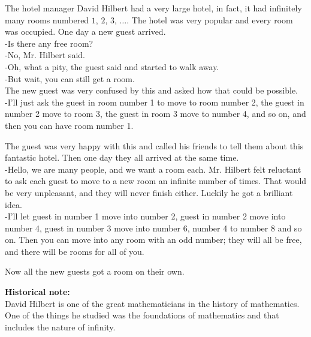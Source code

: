\documentclass[12pt]{article}
\begin{document}

The hotel manager David Hilbert had a very large hotel, in fact, it had infinitely many rooms numbered $1$, $2$, $3$, $\ldots$.  The hotel was very popular and every room was occupied. One day a new guest arrived.\\
-Is there any free room?\\
-No, Mr. Hilbert said.\\
-Oh, what a pity, the guest said and started to walk away.\\
-But wait, you can still get a room.\\

The new guest was very confused by this and asked how that could be possible.\\
-I'll just ask the guest in room number 1 to move to room number 2, the guest in number 2 move to room 3, the guest in room 3 move to number 4, and so on, and then you can have room number 1.

The guest was very happy with this and called his friends to tell them about this fantastic hotel. Then one day they all arrived at the same time.\\
-Hello, we are  many people, and we want a room each.
Mr. Hilbert felt reluctant to ask each guest to move to a new room an infinite number of times. That would be very unpleasant, and they will never finish either. Luckily he got a brilliant idea.\\
-I'll let guest in number 1 move into number 2, guest in number 2 move into number 4, guest in number 3 move into number 6, number 4 to number 8 and so on.
Then you can move into any room with an odd number; they will all be free, and there will be rooms for all of you.

Now all the new guests got a room on their own.

\textbf{Historical note:}\\
David Hilbert is one of the great mathematicians in the history of mathematics. One of the things he studied was the foundations of mathematics and that includes the nature of infinity.
\end{document}
